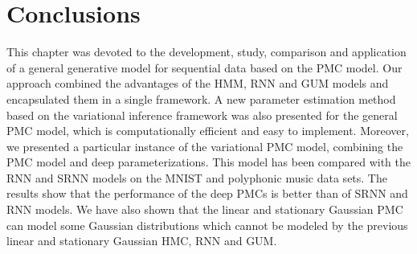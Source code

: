   






\section{Conclusions}
This chapter was devoted to the development, study, comparison 
and application of a general generative model for sequential data 
based on the PMC model.
Our approach combined the advantages of the HMM, RNN and GUM models 
and encapsulated them in a single framework.
A new parameter estimation method based on the variational inference
framework was also presented for the general PMC model, 
which is computationally efficient and easy to implement.
Moreover, we presented a particular instance of the variational PMC model,
combining the PMC model and deep parameterizations. This model has been compared
with the RNN and SRNN models on the MNIST and polyphonic music data sets. The
results show that the performance of the deep PMCs is better than of SRNN and
RNN models.
We have also shown that the linear and stationary Gaussian PMC
can model some Gaussian distributions which cannot be modeled by
the previous linear and stationary Gaussian HMC, RNN and GUM.


